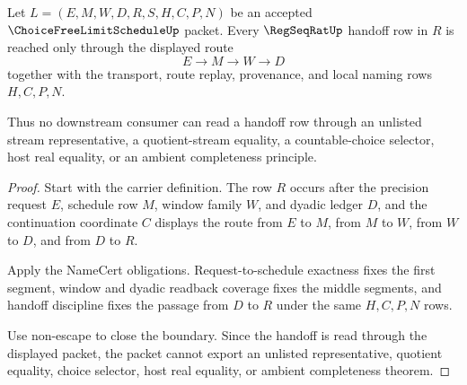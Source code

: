 \begin{theorem}
\label{thm:choice-free-limit-schedule-regseq-handoff-exactness}
Let $L=(E,M,W,D,R,S,H,C,P,N)$ be an accepted $\ChoiceFreeLimitScheduleUp$ packet. Every $\RegSeqRatUp$ handoff row in $R$ is reached only through the displayed route
$$
E \to M \to W \to D
$$
together with the transport, route replay, provenance, and local naming rows $H,C,P,N$.

Thus no downstream consumer can read a handoff row through an unlisted stream representative, a quotient-stream equality, a countable-choice selector, host real equality, or an ambient completeness principle.
\end{theorem}
\begin{proof}
Start with the carrier definition. The row $R$ occurs after the precision request $E$, schedule row $M$, window family $W$, and dyadic ledger $D$, and the continuation coordinate $C$ displays the route from $E$ to $M$, from $M$ to $W$, from $W$ to $D$, and from $D$ to $R$.

Apply the NameCert obligations. Request-to-schedule exactness fixes the first segment, window and dyadic readback coverage fixes the middle segments, and handoff discipline fixes the passage from $D$ to $R$ under the same $H,C,P,N$ rows.

Use non-escape to close the boundary. Since the handoff is read through the displayed packet, the packet cannot export an unlisted representative, quotient equality, choice selector, host real equality, or ambient completeness theorem.
\end{proof}

